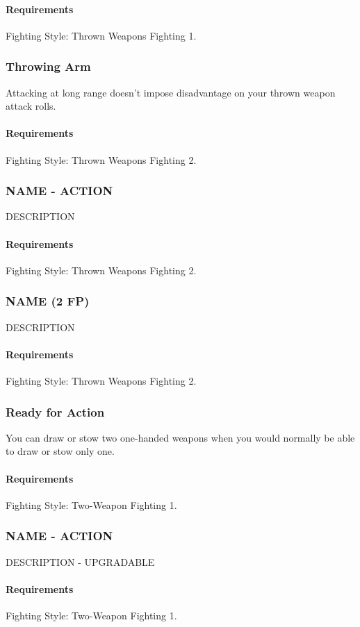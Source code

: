     \paragraph{Requirements} Fighting Style: Thrown Weapons Fighting 1.
\subsubsection{Throwing Arm} \label{feat::throwingarm}
    Attacking at long range doesn't impose disadvantage on your thrown weapon attack rolls.
    \paragraph{Requirements} Fighting Style: Thrown Weapons Fighting 2.
\subsubsection{NAME - ACTION} \label{feat::name}
    DESCRIPTION
    \paragraph{Requirements} Fighting Style: Thrown Weapons Fighting 2.
\subsubsection{NAME (2 FP)} \label{feat::name}
    DESCRIPTION
    \paragraph{Requirements} Fighting Style: Thrown Weapons Fighting 2.
\subsubsection{Ready for Action} \label{feat::readyforaction}
    You can draw or stow two one-handed weapons when you would normally be able to draw or stow only one.
    \paragraph{Requirements} Fighting Style: Two-Weapon Fighting 1.
\subsubsection{NAME - ACTION} \label{feat::name}
    DESCRIPTION - UPGRADABLE
    \paragraph{Requirements} Fighting Style: Two-Weapon Fighting 1.
